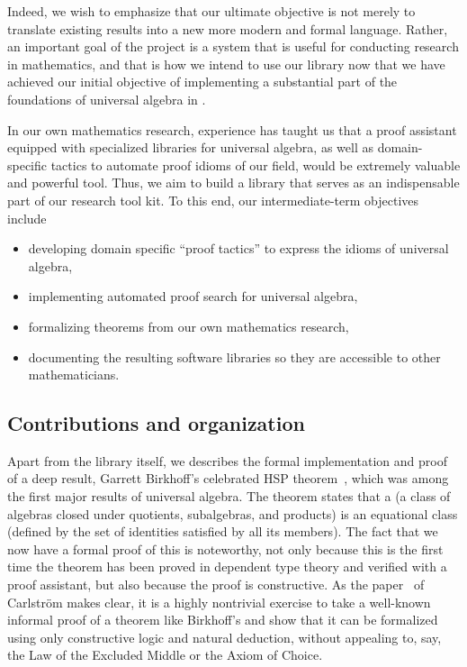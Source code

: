 Indeed, we wish to emphasize that our ultimate objective is not merely to translate existing results into a new more modern and formal language. Rather, an important goal of the \ualib project is a system that is useful for conducting research in mathematics, and that is how we intend to use our library now that we have achieved our initial objective of implementing a substantial part of the foundations of universal algebra in \agda.

In our own mathematics research, experience has taught us that a proof assistant equipped with specialized libraries for universal algebra, as well as domain-specific tactics to automate proof idioms of our field, would be extremely valuable and powerful tool. Thus, we aim to build a library that serves as an indispensable part of our research tool kit. To this end, our intermediate-term objectives include
\begin{itemize}
\item developing domain specific ``proof tactics'' to express the idioms of universal algebra,
\item implementing automated proof search for universal algebra,
\item formalizing theorems from our own mathematics research,
\item documenting the resulting software libraries so they are accessible to other mathematicians.
\end{itemize}

\subsection*{Contributions and organization}
Apart from the library itself, we describes the formal implementation and proof of a deep result, Garrett Birkhoff's celebrated HSP theorem~\cite{Birkhoff:1935}, which was among the first major results of universal algebra.  The theorem states that a  (a class of algebras closed under quotients, subalgebras, and products) is an equational class (defined by the set of identities satisfied by all its members).
The fact that we now have a formal proof of this is noteworthy, not only because this is the first time the theorem has been proved in dependent type theory and verified with a proof assistant, but also because the proof is constructive. As the paper~\cite{Carlstrom:2008} of Carlstr\"om makes clear, it is a highly nontrivial exercise to take a well-known informal proof of a theorem like Birkhoff's and show that it can be formalized using only constructive logic and natural deduction, without appealing to, say, the Law of the Excluded Middle or the Axiom of Choice.

